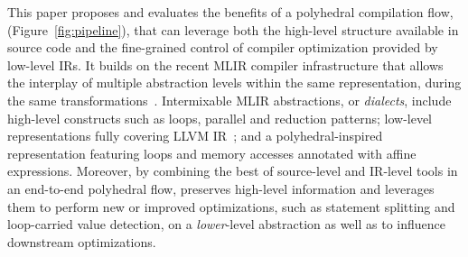 This paper proposes and evaluates the benefits of a polyhedral compilation flow, \tool (Figure~\ref{fig:pipeline}), that can leverage both the high-level structure available in source code and the fine-grained control of compiler optimization provided by low-level IRs. It builds on the recent MLIR compiler infrastructure that allows the interplay of multiple abstraction levels within the same representation, during the same transformations~\cite{mlir}. Intermixable MLIR abstractions, or \emph{dialects}, include high-level constructs such as loops, parallel and reduction patterns; low-level representations fully covering LLVM IR~\cite{llvm}; and a polyhedral-inspired representation featuring loops and memory accesses annotated with affine expressions.
Moreover, by combining the best of source-level and IR-level tools in an end-to-end polyhedral flow, \tool preserves high-level information and leverages them to perform new or improved optimizations, such as statement splitting and loop-carried value detection, on a \emph{lower}-level abstraction as well as to influence downstream optimizations.

